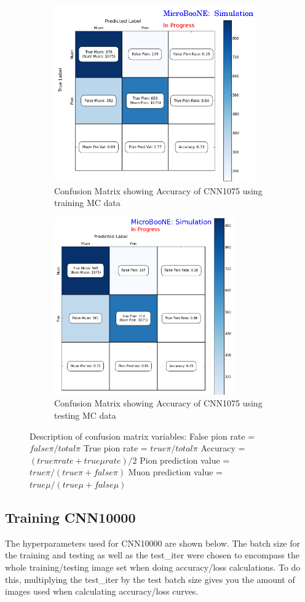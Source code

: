 \begin{figure}[htp!]
\centering
	\begin{subfigure}[b]{.68\textwidth}
	\includegraphics[width=\textwidth,height=3in]{figs/confusion1_train.png}
	\caption{Confusion Matrix showing Accuracy of CNN1075 using training MC data}
	\end{subfigure}
	\quad
	\begin{subfigure}[b]{.6\textwidth}
	\includegraphics[width=\textwidth,height=3in]{figs/confusion1_test.png}
	\caption{Confusion Matrix showing Accuracy of CNN1075 using testing MC data}
	\end{subfigure}
	\quad
\caption{Description of confusion matrix variables: False pion rate = $false \pi/ total \pi$ True pion rate = $true \pi/total \pi$ Accuracy = $(true \pi rate + true \mu rate)/2$ Pion prediction value = $true \pi/(true \pi + false \pi)$ Muon prediction value = $true \mu/(true \mu + false \mu)$}
\label{fig:confusion1075}
\end{figure}

\subsection{Training CNN10000}
The hyperparameters used for CNN10000 are shown below. The batch size for the training and testing as well as the test{\_}iter were chosen to encompass the whole training/testing image set when doing accuracy/loss calculations. To do this, multiplying the test{\_}iter by the test batch size gives you the amount of images used when calculating accuracy/loss curves. 

